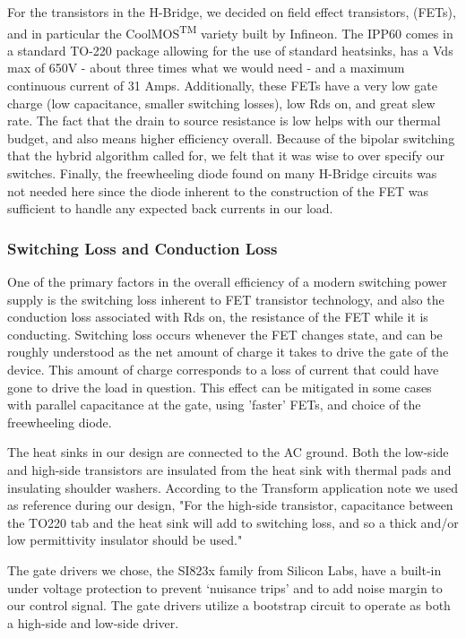 For the transistors in the H-Bridge, we decided on field effect transistors, (FETs), and in particular the CoolMOS\textsuperscript{TM}
variety built by Infineon. The IPP60 comes in a standard TO-220 package allowing for the use of standard heatsinks, has a Vds max of 650V - about three times what we would need - and a maximum continuous current of 31 Amps. Additionally, these FETs have a very low gate charge (low capacitance, smaller switching losses), low Rds on, and great slew rate. The fact that the drain to source resistance is low helps with our thermal budget, and also means higher efficiency overall. Because of the bipolar switching that the hybrid algorithm called for, we felt that it was wise to over specify our switches. Finally, the freewheeling diode found on many H-Bridge circuits was not needed here since the diode inherent to the construction of the FET was sufficient to handle any expected back currents in our load. 

\subsubsection{Switching Loss and Conduction Loss}
One of the primary factors in the overall efficiency of a modern switching power supply is the switching loss inherent to FET transistor technology, and also the conduction loss associated with Rds on, the resistance of the FET while it is conducting. Switching loss occurs whenever the FET changes state, and can be roughly understood as the net amount of charge it takes to drive the gate of the device. This amount of charge corresponds to a loss of current that could have gone to drive the load in question. This effect can be mitigated in some cases with parallel capacitance at the gate, using 'faster' FETs, and choice of the freewheeling diode\cite{switchingLoss}.

The heat sinks in our design are connected to the AC ground. Both the low-side and high-side transistors are insulated from the heat sink with thermal pads and insulating shoulder washers. According to the Transform application note we used as reference during our design, "For the high-side transistor, capacitance between the TO220 tab and the heat sink will add to switching loss, and so a thick and/or low permittivity insulator should be used."\cite{transphorm}

The gate drivers we chose, the SI823x family from Silicon Labs, have a built-in under voltage protection to prevent `nuisance trips' and to add noise margin to our control signal. The gate drivers utilize a bootstrap circuit to operate as both a high-side and low-side driver. 

